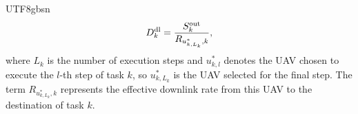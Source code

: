 \documentclass[journal]{IEEEtran}
\begin{document}
\begin{CJK*}{UTF8}{gbsn}
{\color{black}
\begin{equation}
D_k^{\rm dl}
=
\frac{S_k^{\mathrm{out}}}{R_{u^*_{k,L_k},k}},
\end{equation}
where \(L_k\) is the number of execution steps and \( u_{k,l}^* \) denotes the UAV chosen to execute the \( l \)-th step of task \( k \), so \( u_{k,L_k}^* \) is the UAV selected for the final step. The term \( R_{u_{k,L_k}^*,k} \) represents the effective downlink rate from this UAV to the destination of task \( k \).
}






\end{CJK*}
\end{document}

